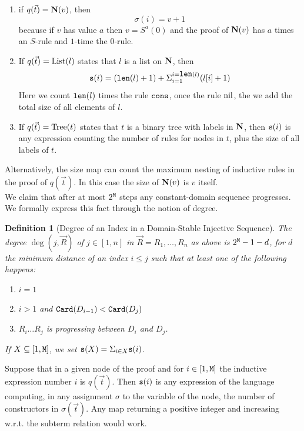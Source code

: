 \documentclass{lmcs}
\newtheorem{definition}[theorem]{Definition}
\begin{document}
\begin{enumerate}
\item 
if $q(\vec{t}) = {\bf N}(v)$, then $$\sigma(i)=v+1$$ because if $v$ has value $a$ 
then $v=S^a(0)$ and the proof of ${\bf N}(v)$ has $a$ times an $S$-rule and $1$-time
the $0$-rule.

\item
If $q(\vec{t}) = {\rm List}(l)$ states that $l$ is a list on ${\bf N}$, 
then $${\tt s}(i) = ({\mbox{\tt len}}(l)+1)+\Sigma_{i=1}^{i={\mbox{\tt len}}(l)}(l[i]+1)$$
Here we count ${\mbox{\tt len}}(l)$ times the rule ${\tt cons}$, once the rule ${{\rm nil}}$,
the we add the total size of all elements of $l$.

\item
If $q(\vec{t}) = {\rm Tree}(t)$ states that $t$ is a binary tree with labels in ${\bf N}$, 
then ${\tt s}(i)$ is any expression counting the number of rules for nodes in $t$, plus the size
of all labels of $t$.
\end{enumerate}

Alternatively, the size map can count the maximum nesting of inductive rules in the proof of $q(\vec{t})$. In this case the size of ${\bf N}(v)$ is $v$ itself.
\\

We claim that after at most $2^{\tt M}$ steps any constant-domain sequence progresses.
We formally express this fact through the notion of degree.

\begin{definition}[Degree of an Index in a Domain-Stable Injective Sequence]
The degree $\deg(j,\vec{R})$ of $j \in [1,n]$ in 
$\vec{R} = R_1, \ldots, R_n$ as above is $2^{\tt M}-1-d$, for $d$ the minimum distance of
an index $i \le j$ such that at least one of the following happens:
\begin{enumerate}
\item
$i=1$
\item
$i>1$ and ${\tt Card}(D_{i-1}) < {\tt Card}(D_j)$
\item
$R_{i} \ldots R_j$ is progressing between $D_i$ and $D_j$.
\end{enumerate}
If $X \subseteq [1,{\tt M}]$, we set ${\tt s}(X) = \Sigma_{i \in X} {\tt s}(i)$.
\end{definition}
 
Suppose that in a given node of the proof and for $i \in [1, {\tt M}]$ 
the inductive expression number $i$ is $q(\vec{t})$. Then ${\tt s}(i)$ is any expression
of the language computing, in any assignment $\sigma$ to the variable of the node, 
the number of constructors in $\sigma(\vec{t})$. Any map returning a positive integer
and increasing w.r.t. the subterm relation would work. 
\end{document}
